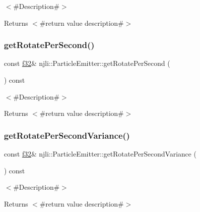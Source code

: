 $<$\#\+Description\#$>$

\begin{DoxyReturn}{Returns}
$<$\#return value description\#$>$ 
\end{DoxyReturn}
\mbox{\label{classnjli_1_1_particle_emitter_a548433364fd93ab4225af78aee61930f}} 
\subsubsection{\texorpdfstring{get\+Rotate\+Per\+Second()}{getRotatePerSecond()}}
{\footnotesize\ttfamily const \mbox{\hyperlink{_util_8h_a5f6906312a689f27d70e9d086649d3fd}{f32}}\& njli\+::\+Particle\+Emitter\+::get\+Rotate\+Per\+Second (\begin{DoxyParamCaption}{ }\end{DoxyParamCaption}) const}

$<$\#\+Description\#$>$

\begin{DoxyReturn}{Returns}
$<$\#return value description\#$>$ 
\end{DoxyReturn}
\mbox{\label{classnjli_1_1_particle_emitter_a7c17bfaf96fc5981f99d9eb6f7781de2}} 
\subsubsection{\texorpdfstring{get\+Rotate\+Per\+Second\+Variance()}{getRotatePerSecondVariance()}}
{\footnotesize\ttfamily const \mbox{\hyperlink{_util_8h_a5f6906312a689f27d70e9d086649d3fd}{f32}}\& njli\+::\+Particle\+Emitter\+::get\+Rotate\+Per\+Second\+Variance (\begin{DoxyParamCaption}{ }\end{DoxyParamCaption}) const}

$<$\#\+Description\#$>$

\begin{DoxyReturn}{Returns}
$<$\#return value description\#$>$ 
\end{DoxyReturn}
\mbox{\label{classnjli_1_1_particle_emitter_afd6af26a2f2fc62ac9ec755bc8fb3e31}} 
